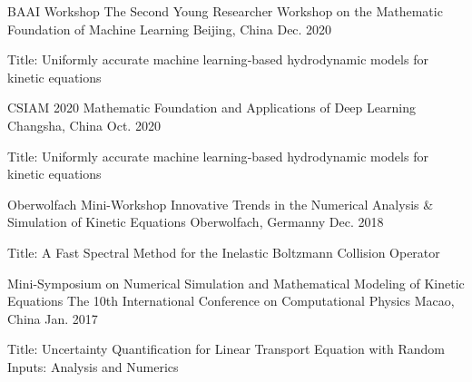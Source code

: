 

\begin{cventries}

  \cventry
    {BAAI Workshop} %
    {The Second Young Researcher Workshop on the Mathematic Foundation of Machine Learning} %
    {Beijing, China} %
    {Dec. 2020} %
    {
      \begin{cvitems} %
        \item {Title: Uniformly accurate machine learning‑based hydrodynamic models for kinetic equations}
      \end{cvitems}
    }


  \cventry
    {CSIAM 2020} %
    {Mathematic Foundation and Applications of Deep Learning} %
    {Changsha, China} %
    {Oct. 2020} %
    {
      \begin{cvitems} %
        \item {Title: Uniformly accurate machine learning‑based hydrodynamic models for kinetic equations}
      \end{cvitems}
    }

  \cventry
    {Oberwolfach Mini-Workshop} %
    {Innovative Trends in the Numerical Analysis \& Simulation of
      Kinetic Equations} %
    {Oberwolfach, Germanny} %
    {Dec. 2018} %
    {
      \begin{cvitems} %
        \item {Title: A Fast Spectral Method for the Inelastic Boltzmann Collision Operator}
      \end{cvitems}
    }

  \cventry
    {Mini-Symposium on Numerical Simulation and Mathematical Modeling of
      Kinetic Equations} %
    {The 10th International Conference on Computational Physics} %
    {Macao, China} %
    {Jan. 2017} %
    {
      \begin{cvitems} %
        \item {Title: Uncertainty Quantification for Linear Transport Equation
          with Random Inputs: Analysis and Numerics}
      \end{cvitems}
    }


\end{cventries}
